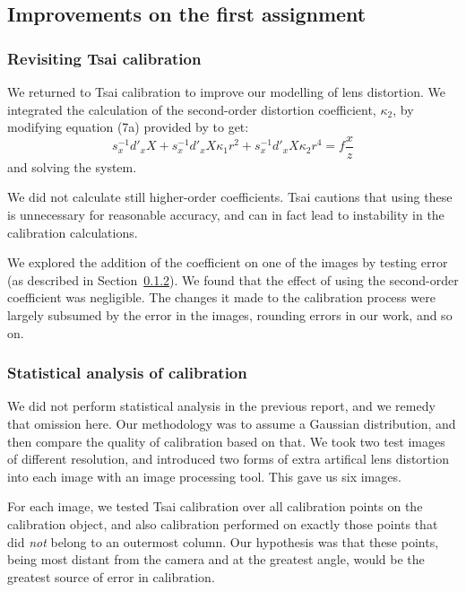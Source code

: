 
\subsection{Improvements on the first assignment}
\label{sec:improvements}

\subsubsection{Revisiting Tsai calibration}

%

We returned to Tsai calibration to improve our modelling of lens distortion. We integrated the calculation of the second-order distortion coefficient, $\kappa_{2}$, by modifying equation (7a) provided by \citet{TSAI} to get:
\[
	s_{x}^{-1}d'_{x}X + s_{x}^{-1}d'_{x}X\kappa_{1}r^{2} + s_{x}^{-1}d'_{x}X\kappa_{2}r^{4} = f\frac{x}{z}
\]
and solving the system.

We did not calculate still higher-order coefficients. Tsai cautions that using these is unnecessary for reasonable accuracy, and can in fact lead to instability in the calibration calculations. \cite{TSAI}

We explored the addition of the coefficient on one of the images by testing error (as described in Section~\ref{sec:statcalibration}). We found that the effect of using the second-order coefficient was negligible. The changes it made to the calibration process were largely subsumed by the error in the images, rounding errors in our work, and so on.

%

\subsubsection{Statistical analysis of calibration}
\label{sec:statcalibration}

We did not perform statistical analysis in the previous report, and we remedy that omission here. Our methodology was to assume a Gaussian distribution, and then compare the quality of calibration based on that. We took two test images of different resolution, and introduced two forms of extra artifical lens distortion into each image with an image processing tool. This gave us six images.

For each image, we tested Tsai calibration over all calibration points on the calibration object, and also calibration performed on exactly those points that did \emph{not} belong to an outermost column. Our hypothesis was that these points, being most distant from the camera and at the greatest angle, would be the greatest source of error in calibration.

